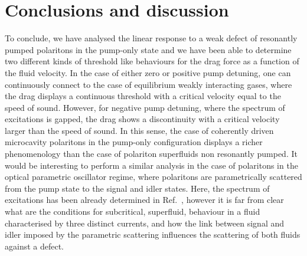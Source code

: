 \section{Conclusions and discussion}
\label{sec:concl}
%
To conclude, we have analysed the linear response to a weak defect of
resonantly pumped polaritons in the pump-only state and we have been
able to determine two different kinds of threshold like behaviours for
the drag force as a function of the fluid velocity. In the case of
either zero or positive pump detuning, one can continuously connect to
the case of equilibrium weakly interacting gases, where the drag
displays a continuous threshold with a critical velocity equal to the
speed of sound. However, for negative pump detuning, where the
spectrum of excitations is gapped, the drag shows a discontinuity with
a critical velocity larger than the speed of sound. In this sense, the
case of coherently driven microcavity polaritons in the pump-only
configuration displays a richer phenomenology than the case of
polariton superfluids non resonantly pumped. It would be interesting
to perform a similar analysis in the case of polaritons in the optical
parametric oscillator regime, where polaritons are parametrically
scattered from the pump state to the signal and idler states. Here,
the spectrum of excitations has been already determined in
Ref.~\cite{Wouters_2007}, however it is far from clear what are the
conditions for subcritical, superfluid, behaviour in a fluid
characterised by three distinct currents, and how the link between
signal and idler imposed by the parametric scattering influences the
scattering of both fluids against a defect.


